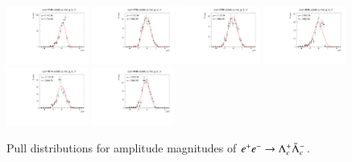 \begin{figure}[h]
    \includegraphics[width=0.24\textwidth]{figure/io/gls/pull_gls_epem4740_Lmdc.aLmdc_g_ls_1r.pdf}
    \includegraphics[width=0.24\textwidth]{figure/io/gls/pull_gls_epem4750_Lmdc.aLmdc_g_ls_1r.pdf}
    \includegraphics[width=0.24\textwidth]{figure/io/gls/pull_gls_epem4780_Lmdc.aLmdc_g_ls_1r.pdf}
    \includegraphics[width=0.24\textwidth]{figure/io/gls/pull_gls_epem4840_Lmdc.aLmdc_g_ls_1r.pdf}
    \includegraphics[width=0.24\textwidth]{figure/io/gls/pull_gls_epem4914_Lmdc.aLmdc_g_ls_1r.pdf}
    \includegraphics[width=0.24\textwidth]{figure/io/gls/pull_gls_epem4946_Lmdc.aLmdc_g_ls_1r.pdf}
    \caption{Pull distributions for amplitude magnitudes of $e^+e^-\rightarrow\Lambda_{c}^{+}\bar{\Lambda}_{c}^{-}$.}
\label{fig:io_pull_magnitudes}
\end{figure}

